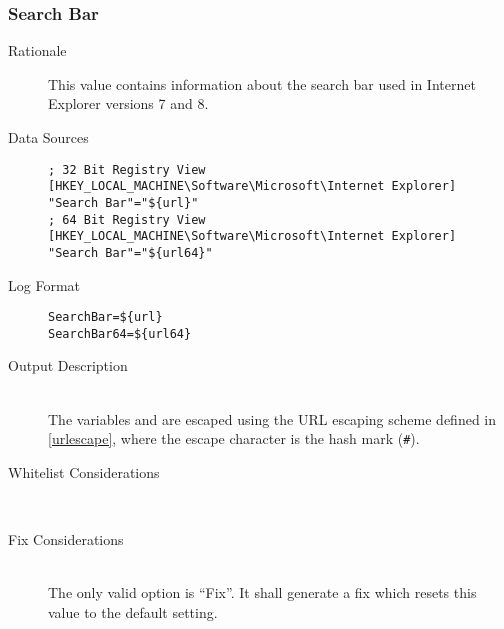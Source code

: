 \subsubsection{Search Bar}
\begin{description}
\item[Rationale] This value contains information about the search bar used in
Internet Explorer versions 7 and 8.

\item[Data Sources] \hfill
\vspace{-\baselineskip}
\begin{verbatim}
; 32 Bit Registry View
[HKEY_LOCAL_MACHINE\Software\Microsoft\Internet Explorer]
"Search Bar"="${url}"
; 64 Bit Registry View
[HKEY_LOCAL_MACHINE\Software\Microsoft\Internet Explorer]
"Search Bar"="${url64}"
\end{verbatim}
\item[Log Format] \hfill
\vspace{-\baselineskip}
\begin{verbatim} 
SearchBar=${url}
SearchBar64=${url64}
\end{verbatim}
\item[Output Description] \hfill \\
The variables  and  are escaped using the URL escaping
scheme defined in \ref{urlescape}, where the escape character is the hash mark
(\verb|#|).
\item[Whitelist Considerations] \hfill \\

\item[Fix Considerations] \hfill \\
The only valid option is ``Fix''. It shall generate a fix which resets this
value to the default setting.
\end{description}

